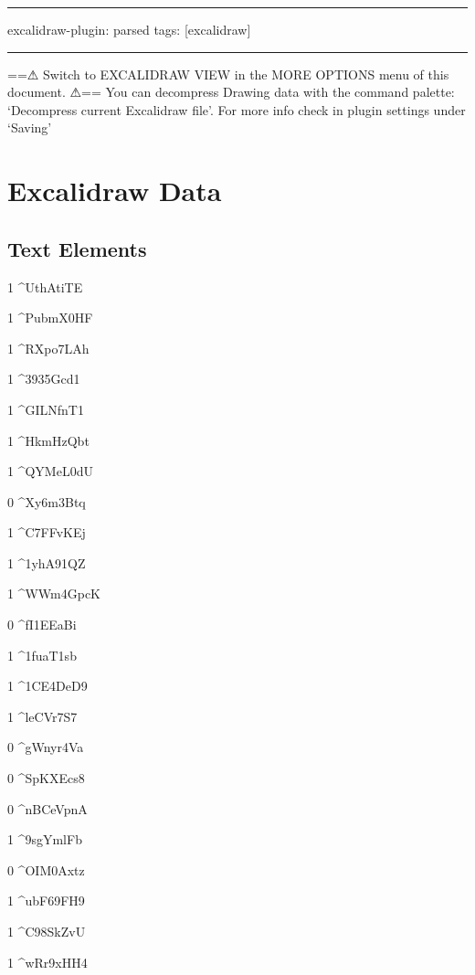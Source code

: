 \documentclass[]{article}
\begin{document}

\begin{center}\rule{0.5\linewidth}{0.5pt}\end{center}

excalidraw-plugin: parsed tags: {[}excalidraw{]}

\begin{center}\rule{0.5\linewidth}{0.5pt}\end{center}

==⚠ Switch to EXCALIDRAW VIEW in the MORE OPTIONS menu of this document.
⚠== You can decompress Drawing data with the command palette:
`Decompress current Excalidraw file'. For more info check in plugin
settings under `Saving'

\hypertarget{excalidraw-data}{%
\section{Excalidraw Data}\label{excalidraw-data}}

\hypertarget{text-elements}{%
\subsection{Text Elements}\label{text-elements}}

1 \^{}UthAtiTE

1 \^{}PubmX0HF

1 \^{}RXpo7LAh

1 \^{}3935Gcd1

1 \^{}GILNfnT1

1 \^{}HkmHzQbt

1 \^{}QYMeL0dU

0 \^{}Xy6m3Btq

1 \^{}C7FFvKEj

1 \^{}1yhA91QZ

1 \^{}WWm4GpcK

0 \^{}fI1EEaBi

1 \^{}1fuaT1sb

1 \^{}1CE4DeD9

1 \^{}leCVr7S7

0 \^{}gWnyr4Va

0 \^{}SpKXEcs8

0 \^{}nBCeVpnA

1 \^{}9sgYmlFb

0 \^{}OIM0Axtz

1 \^{}ubF69FH9

1 \^{}C98SkZvU

1 \^{}wRr9xHH4
\end{document}
